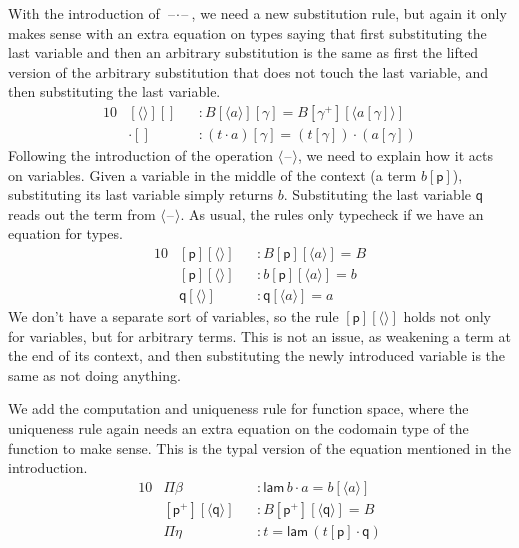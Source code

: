 \documentclass[sigplan,10pt,anonymous,review]{acmart}\settopmatter{printfolios=true,printccs=false,printacmref=false}
\newcommand{\p}{\mathsf{p}}
\newcommand{\q}{\mathsf{q}}
\newcommand{\lam}{\mathsf{lam}}
\newcommand{\blank}{\mathord{\hspace{1pt}\text{--}\hspace{1pt}}} %
\begin{document}
With the introduction of $\blank\cdot\blank$, we need a new
substitution rule, but again it only makes sense with an extra
equation on types saying that first substituting the last variable and
then an arbitrary substitution is the same as first the lifted version
of the arbitrary substitution that does not touch the last variable,
and then substituting the last variable.
\begin{alignat*}{10}
& [\langle\rangle][] && : B[\langle a\rangle][\gamma] = B[\gamma^+][\langle a[\gamma]\rangle] \\
& {\cdot}[] && : (t\cdot a)[\gamma] = (t[\gamma])\cdot(a[\gamma])
\end{alignat*}
Following the introduction of the operation $\langle\blank\rangle$, we
need to explain how it acts on variables. Given a variable in the
middle of the context (a term $b[\p]$), substituting its last variable
simply returns $b$. Substituting the last variable $\q$ reads out the
term from $\langle\blank\rangle$. As usual, the rules only typecheck
if we have an equation for types.
\begin{alignat*}{10}
& [\p][\langle\rangle] && : B[\p][\langle a\rangle] = B \\
& [\p][\langle\rangle] && : b[\p ][\langle a\rangle] = b \\
& \q[\langle\rangle] && : \q[\langle a\rangle] = a
\end{alignat*}
We don't have a separate sort of variables, so the rule
$[\p][\langle\rangle]$ holds not only for variables, but for arbitrary
terms. This is not an issue, as weakening a term at the end of its
context, and then substituting the newly introduced variable is the
same as not doing anything.

We add the computation and uniqueness rule for function space, where
the uniqueness rule again needs an extra equation on the codomain type
of the function to make sense. This is the typal version of the
equation mentioned in the introduction.
\begin{alignat*}{10}
& \Pi\beta && : \lam\,b\cdot a = b[\langle a\rangle] \\
& [\p^+][\langle\q\rangle] && : B[\p^+][\langle\q\rangle] = B \\
& \Pi\eta && : t = \lam\,(t[\p]\cdot\q)
\end{alignat*}
\end{document}
